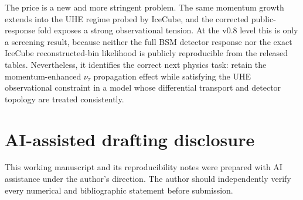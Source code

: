 \documentclass[11pt,a4paper]{article}
\begin{document}
The price is a new and more stringent problem.  The same momentum growth
extends into the UHE regime probed by IceCube, and the corrected public-response
fold exposes a strong observational tension.  At the v0.8 level this is only a
screening result, because neither the full BSM detector response nor the exact
IceCube reconstructed-bin likelihood is publicly reproducible from the
released tables.  Nevertheless, it identifies the correct next physics task:
retain the momentum-enhanced $\nu_\tau$ propagation effect while satisfying
the UHE observational constraint in a model whose differential transport and
detector topology are treated consistently.

\section*{AI-assisted drafting disclosure}
This working manuscript and its reproducibility notes were prepared with AI
assistance under the author's direction.  The author should independently
verify every numerical and bibliographic statement before submission.



\end{document}
